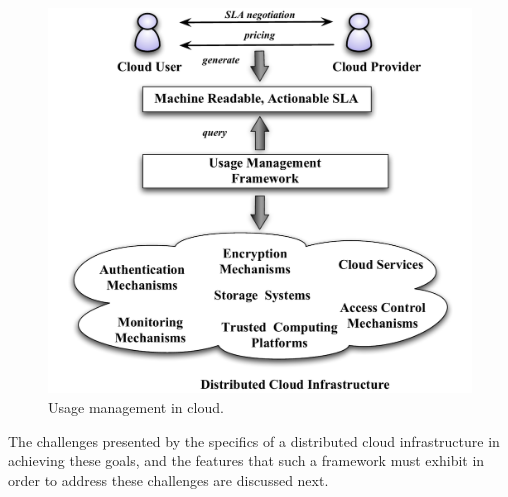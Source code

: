 \documentclass[10pt, conference, compsocconf]{IEEEtran}
\begin{document}
\begin{figure}[!t]
\centering
\includegraphics[scale=0.4]{cloud-umf}
\caption{Usage management in cloud.}
\label{fig:cloud-umf}
\end{figure}

The challenges presented by the specifics of a distributed cloud infrastructure in achieving these goals, and the features that such a framework must exhibit in order to address these challenges are discussed next. 

\end{document}
